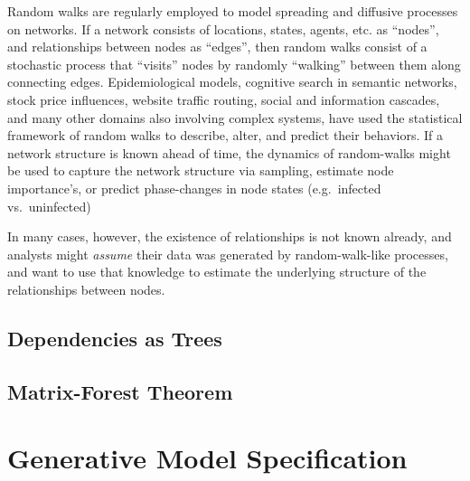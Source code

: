 \documentclass[%
	12pt,
		oneside,
		letterpaper
]{book}
\begin{document}
Random walks are regularly employed to model spreading and diffusive
processes on networks. If a network consists of locations, states,
agents, etc. as ``nodes'', and relationships between nodes as ``edges'',
then random walks consist of a stochastic process that ``visits'' nodes
by randomly ``walking'' between them along connecting edges.
Epidemiological models, cognitive search in semantic networks, stock
price influences, website traffic routing, social and information
cascades, and many other domains also involving complex systems, have
used the statistical framework of random walks to describe, alter, and
predict their behaviors. If a network structure is known ahead of time,
the dynamics of random-walks might be used to capture the network
structure via sampling, estimate node importance's, or predict
phase-changes in node states (e.g.~infected vs.~uninfected)

In many cases, however, the existence of relationships is not known
already, and analysts might \emph{assume} their data was generated by
random-walk-like processes, and want to use that knowledge to estimate
the underlying structure of the relationships between nodes.

\subsection{Dependencies as Trees}\label{dependencies-as-trees}

\subsection{Matrix-Forest Theorem}\label{matrix-forest-theorem}

\section{Generative Model
Specification}\label{generative-model-specification}
\end{document}
